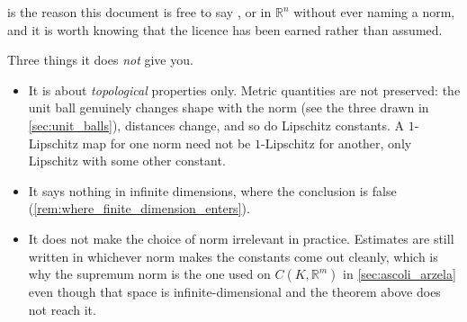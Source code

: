 \begin{ainote}
\label{ainote:norm_equivalence_scope}
 is the reason this document is free to say , 
or  in $\mathbb{R}^n$ without ever naming a norm, and it is worth knowing that the
licence has been earned rather than assumed.

Three things it does \emph{not} give you.
\begin{itemize}
  \item It is about \emph{topological} properties only. Metric quantities are not preserved:
    the unit ball genuinely changes shape with the norm (see the three drawn in
    \cref{sec:unit_balls}), distances change, and so do Lipschitz constants. A $1$-Lipschitz map
    for one norm need not be $1$-Lipschitz for another, only Lipschitz with some other constant.
  \item It says nothing in infinite dimensions, where the conclusion is false
    (\cref{rem:where_finite_dimension_enters}).
  \item It does not make the choice of norm irrelevant in practice. Estimates are still written
    in whichever norm makes the constants come out cleanly, which is why the supremum norm is the
    one used on $C(K,\mathbb{R}^m)$ in \cref{sec:ascoli_arzela} even though that space is
    infinite-dimensional and the theorem above does not reach it.
\end{itemize}
\end{ainote}
